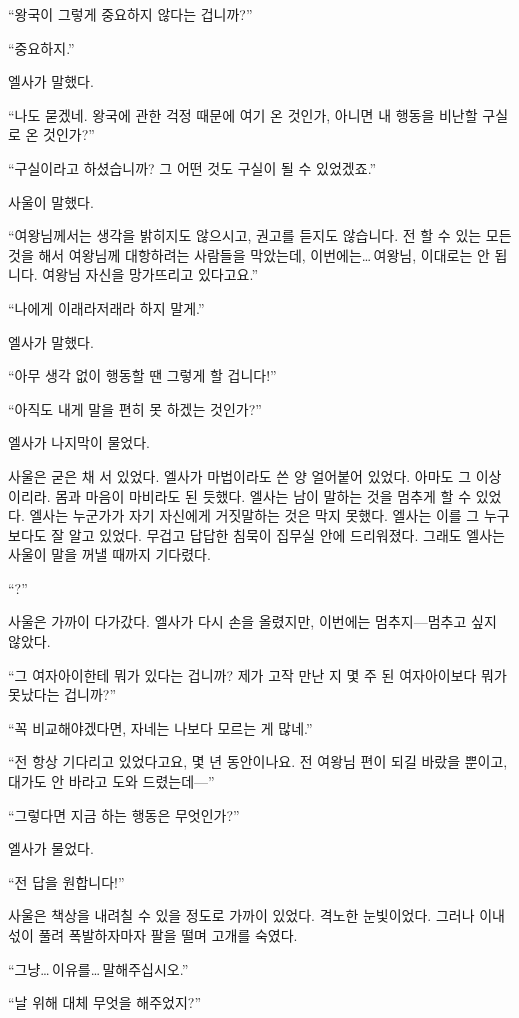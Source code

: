 ``왕국이 그렇게 중요하지 않다는 겁니까?''

``중요하지.''

엘사가 말했다.

``나도 묻겠네. 왕국에 관한 걱정 때문에 여기 온 것인가, 아니면 내 행동을 비난할 구실로 온 것인가?''

``구실이라고 하셨습니까? 그 어떤 것도 구실이 될 수 있었겠죠.''

사울이 말했다.

``여왕님께서는 생각을 밝히지도 않으시고, 권고를 듣지도 않습니다. 전 할 수 있는 모든 것을 해서 여왕님께 대항하려는 사람들을 막았는데, 이번에는\ldots\,여왕님, 이대로는 안 됩니다. 여왕님 자신을 망가뜨리고 있다고요.''

``나에게 이래라저래라 하지 말게.''

엘사가 말했다.

``아무 생각 없이 행동할 땐 그렇게 할 겁니다!''

``아직도 내게 말을 편히 못 하겠는 것인가?''

엘사가 나지막이 물었다.

사울은 굳은 채 서 있었다. 엘사가 마법이라도 쓴 양 얼어붙어 있었다. 아마도 그 이상이리라. 몸과 마음이 마비라도 된 듯했다. 엘사는 남이 말하는 것을 멈추게 할 수 있었다. 엘사는 누군가가 자기 자신에게 거짓말하는 것은 막지 못했다. 엘사는 이를 그 누구보다도 잘 알고 있었다. 무겁고 답답한 침묵이 집무실 안에 드리워졌다. 그래도 엘사는 사울이 말을 꺼낼 때까지 기다렸다.

``?''

사울은 가까이 다가갔다. 엘사가 다시 손을 올렸지만, 이번에는 멈추지—멈추고 싶지 않았다.

``그 여자아이한테 뭐가 있다는 겁니까? 제가 고작 만난 지 몇 주 된 여자아이보다 뭐가 못났다는 겁니까?''

``꼭 비교해야겠다면, 자네는 나보다 모르는 게 많네.''

``전 항상 기다리고 있었다고요, 몇 년 동안이나요. 전 여왕님 편이 되길 바랐을 뿐이고, 대가도 안 바라고 도와 드렸는데—''

``그렇다면 지금 하는 행동은 무엇인가?''

엘사가 물었다.

``전 답을 원합니다!''

사울은 책상을 내려칠 수 있을 정도로 가까이 있었다. 격노한 눈빛이었다. 그러나 이내 섟이 풀려 폭발하자마자 팔을 떨며 고개를 숙였다.

``그냥\ldots\,이유를\ldots\,말해주십시오.''

``날 위해 대체 무엇을 해주었지?''

